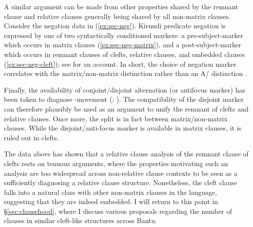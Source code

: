\documentclass[12pt]{article}
\begin{document}
A similar argument can be made from other properties shared by the remnant clause and relative clauses generally being shared by all non-matrix clauses. Consider the negation data in (\ref{ex:sec-neg}). Kirundi predicate negation is expressed by one of two syntactically conditioned markers: a pre-subject-marker  which occurs in matrix clauses (\ref{ex:sec-neg-matrix}), and a post-subject-marker  which occurs in remnant clauses of clefts, relative clauses, and embedded clauses (\ref{ex:sec-neg-cleft}); see \citealt{chaperon-batom} for an account. In short, the choice of negation marker correlates with the matrix/non-matrix distinction rather than an A/\abar{} distinction \citep{ndayiragije-1999}.

\bex
\ex {} \label{ex:sec-neg}
\bxl
{}  \label{ex:sec-neg-matrix}
 \label{ex:sec-neg-cleft}
\fxl
\fex

Finally, the availability of conjoint/disjoint alternation (or antifocus marker) has been taken to diagnose \abar{}-movement (\citealt[p. xx]{ndayiragije-1999}; \citealt{nshemezimana-bostoen-2017}). The compatibility of the disjoint marker can therefore plausibly be used as an argument to unify the remnant of clefts and relative clauses. Once more, the split is in fact between matrix/non-matrix clauses. While the disjoint/anti-focus marker  is available in matrix clauses, it is ruled out in clefts. 

\bex
\ex {}\bxl
{}
\fxl
\fex

The data above has shown that a relative clause analysis of the remnant clause of clefts rests on tenuous arguments, where the properties motivating such an analysis are too widespread across non-relative clause contexts to be seen as a sufficiently diagnosing a relative clause structure. Nonetheless, the cleft clause falls into a natural class with other non-matrix clauses in the language, suggesting that they are indeed embedded. I will return to this point in \S\ref{sec:clausehood}, where I discuss various proposals regarding the number of clauses in similar cleft-like structures across Bantu.
\end{document}
